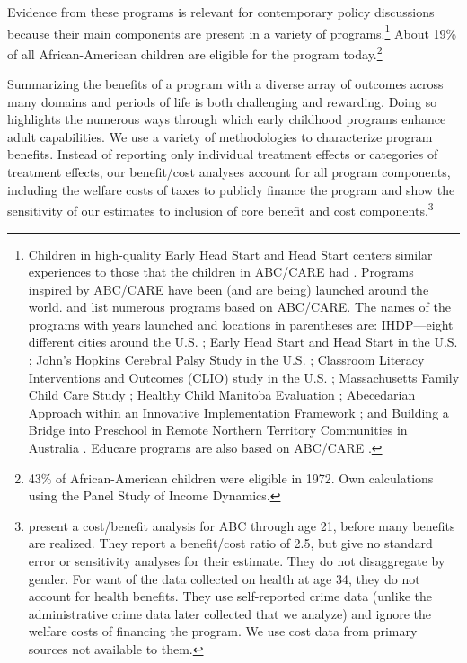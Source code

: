 Evidence from these programs is relevant for contemporary policy discussions because their main components are present in a variety of programs.\footnote{Children in high-quality Early Head Start and Head Start centers similar experiences to those that the children in ABC/CARE had \citep{HeadStart_2010_ChoosingPreschoolCurriculum,Puma_Bell_etal_2010_HeadStartImpact,Elango_Hojman_etal_2016_Early-Edu}. Programs inspired by ABC/CARE have been (and are being) launched around the world. \citet{Sparling_2010_Highlights} and \citet{Ramey_Ramey_Lanzi_2014_Interventions} list numerous programs based on ABC/CARE. The names of the programs with years launched and locations in parentheses are: IHDP---eight different cities around the U.S. \citep{Spiker-etal_1997_Helping}; Early Head Start and Head Start in the U.S. \citep{Schneider_McDonald-eds_2007_Scale-Up_Vol-1}; John's Hopkins Cerebral Palsy Study in the U.S. \citep{Sparling_2010_Highlights}; Classroom Literacy Interventions and Outcomes (CLIO) study in the U.S. \citep{Sparling_2010_Highlights}; Massachusetts Family Child Care Study \citep{Collins_etal_2010_Massachusetts-Study}; Healthy Child Manitoba Evaluation \citep{Healthy_Child_Manitoba_2015_Starting-Early}; Abecedarian Approach within an Innovative Implementation Framework \citep{Jensen_Nielsen_2016_ABC-Programme-Pilot}; and Building a Bridge into Preschool in Remote Northern Territory Communities in Australia \citep{UMonash_Dataset_2015_URL}. Educare programs are also based on ABC/CARE \citep{Educare_2014_Research_Agenda,Yazejian_Bryant_2012_Educare}.} About 19\% of all African-American children are eligible for the program today.\footnote{43\% of African-American children were eligible in 1972. Own calculations using the Panel Study of Income Dynamics.}

Summarizing the benefits of a program with a diverse array of outcomes across many domains and periods of life is both challenging and rewarding. Doing so highlights the numerous ways through which early childhood programs enhance adult capabilities. We use a variety of methodologies to characterize program benefits. Instead of reporting only individual treatment effects or categories of treatment effects, our benefit/cost analyses account for all program components, including the welfare costs of taxes to publicly finance the program and show the sensitivity of our estimates to inclusion of core benefit and cost components.\footnote{\cite{Barnett_Masse_2002_benefitcost,Barnett_Masse_2007_EER} present a cost/benefit analysis for ABC through age 21, before many benefits are realized. They report a benefit/cost ratio of 2.5, but give no standard error or sensitivity analyses for their estimate. They do not disaggregate by gender. For want of the data collected on health at age 34, they do not account for health benefits. They use self-reported crime data (unlike the administrative crime data later collected that we analyze) and ignore the welfare costs of financing the program. We use cost data from primary sources not available to them.}

